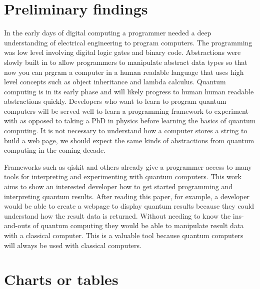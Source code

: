 \documentclass{article}
\begin{document}
\section{Preliminary findings}

In the early days of digital computing a programmer needed a deep understanding of electrical engineering to program computers. The programming was low level involving digital logic gates and binary code. Abstractions were slowly built in to allow programmers to manipulate abstract data types so that now you can prgram a computer in a human readable language that uses high level concepts such as object inheritance and lambda calculus. Quantum computing is in its early phase and will likely progress to human human readable abstractions quickly. Developers who want to learn to program quantum computers will be served well to learn a programming framework to experiment with as opposed to taking a PhD in physics before learning the basics of quantum computing. It is not necessary to understand how a computer stores a string to build a web page, we should expect the same kinds of abstractions from quantum computing in the coming decade.

Frameworks such as qiskit and others already give a programmer access to many tools for interpreting and experimenting with quantum computers. This work aims to show an interested developer how to get started programming and interpreting quantum results. After reading this paper, for example, a developer would be able to create a webpage to display quantum results because they could understand how the result data is returned. Without needing to know the ins-and-outs of quantum computing they would be able to manipulate result data with a classical computer. This is a valuable tool because quantum computers will always be used with classical computers.


\section{Charts or tables}
\end{document}
